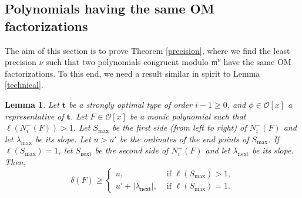 \documentclass{amsart}
\newtheorem{lemma}[theorem]{Lemma}
\begin{document}
\subsection{Polynomials having the same OM factorizations} 
The aim of this section is to prove Theorem \ref{precision}, where we find the least precision $\nu$ such that two polynomials congruent modulo ${{\mathfrak m}}^\nu$ have the same OM factorizations. To this end, we need a result similar in spirit to Lemma \ref{technical}.

\begin{lemma}\label{technical2}
Let ${\mathbf{t}}$ be a strongly optimal type of order $i-1\ge 0$, and $\phi\in {\mathcal{O}}[x]$ a representative of ${\mathbf{t}}$. 
Let $F\in{\mathcal{O}}[x]$ be a monic polynomial such that $\ell(N_i^-(F))>1$. 
Let ${S_{\operatorname{max}}}$ be the first side (from left to right) of $N_i^-(F)$ and let ${\lambda_{\operatorname{max}}}$ be its slope. Let $u>u'$ be the ordinates of the end points of ${S_{\operatorname{max}}}$. If $\ell({S_{\operatorname{max}}})=1$, let ${S_{\operatorname{next}}}$ be the second side of $N_i^-(F)$ and let ${\lambda_{\operatorname{next}}}$ be its slope. Then,
$$
\delta(F)\ge\begin{cases}u,&\mbox{ if }\ell({S_{\operatorname{max}}})>1,\\
u'+|{\lambda_{\operatorname{next}}}|,&\mbox{ if }\ell({S_{\operatorname{max}}})=1.
\end{cases}
$$
\end{lemma}
\end{document}
